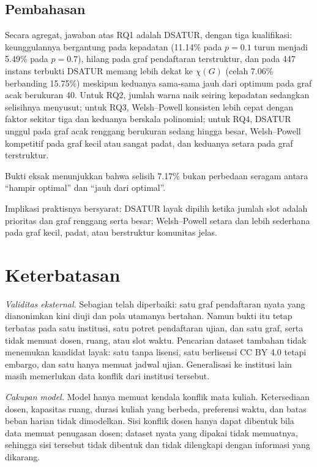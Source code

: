 \documentclass[conference,a4paper]{IEEEtran}
\begin{document}
\subsection{Pembahasan}
Secara agregat, jawaban atas RQ1 adalah DSATUR, dengan tiga kualifikasi:
keunggulannya bergantung pada kepadatan (11.14\% pada $p=0.1$ turun menjadi
5.49\% pada $p=0.7$), hilang pada graf pendaftaran terstruktur, dan pada 447
instans terbukti DSATUR memang lebih dekat ke $\chi(G)$ (celah 7.06\%
berbanding 15.75\%) meskipun keduanya sama-sama jauh dari optimum pada graf
acak berukuran 40. Untuk RQ2, jumlah warna naik seiring kepadatan sedangkan
selisihnya menyusut; untuk RQ3, Welsh--Powell konsisten lebih cepat dengan
faktor sekitar tiga dan keduanya berskala polinomial; untuk RQ4, DSATUR unggul
pada graf acak renggang berukuran sedang hingga besar, Welsh--Powell kompetitif
pada graf kecil atau sangat padat, dan keduanya setara pada graf terstruktur.

Bukti eksak menunjukkan bahwa selisih 7.17\% bukan perbedaan seragam antara
``hampir optimal'' dan ``jauh dari optimal''.

Implikasi praktisnya bersyarat: DSATUR layak dipilih ketika jumlah slot adalah
prioritas dan graf renggang serta besar; Welsh--Powell setara dan lebih
sederhana pada graf kecil, padat, atau berstruktur komunitas jelas.

\section{Keterbatasan}
\label{sec:limits}

\emph{Validitas eksternal.} Sebagian telah diperbaiki: satu graf pendaftaran
nyata yang dianonimkan kini diuji dan pola utamanya bertahan. Namun bukti itu
tetap terbatas pada satu institusi, satu potret pendaftaran ujian, dan satu
graf, serta tidak memuat dosen, ruang, atau slot waktu. Pencarian dataset
tambahan tidak menemukan kandidat layak: satu tanpa lisensi, satu berlisensi
CC BY 4.0 tetapi embargo, dan satu hanya memuat jadwal ujian. Generalisasi ke
institusi lain masih memerlukan data konflik dari institusi tersebut.

\emph{Cakupan model.} Model hanya memuat kendala konflik mata kuliah.
Ketersediaan dosen, kapasitas ruang, durasi kuliah yang berbeda, preferensi
waktu, dan batas beban harian tidak dimodelkan. Sisi konflik dosen hanya dapat
dibentuk bila data memuat penugasan dosen; dataset nyata yang dipakai tidak
memuatnya, sehingga sisi tersebut tidak dibentuk dan tidak dilengkapi dengan
informasi yang dikarang.
\end{document}
